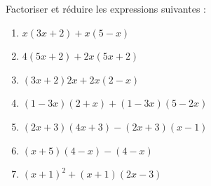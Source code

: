 \begin{exo}[Factorisation]
	Factoriser et réduire les expressions suivantes :
	\begin{enumerate}[label=\alph*)]
		\item $x(3x + 2) + x(5 - x)$
		\item $4(5x + 2) + 2x(5x + 2)$
		\item $(3x + 2)2x + 2x(2 - x)$
		\item $(1 - 3x)(2 + x) + (1 - 3x)(5 - 2x)$
		\item $(2x + 3)(4x + 3) - (2x + 3)(x - 1)$
		\item $(x + 5)(4 - x) - (4 - x)$
		\item $(x + 1)^{2} + (x + 1)(2x - 3)$
	\end{enumerate}
\end{exo}
